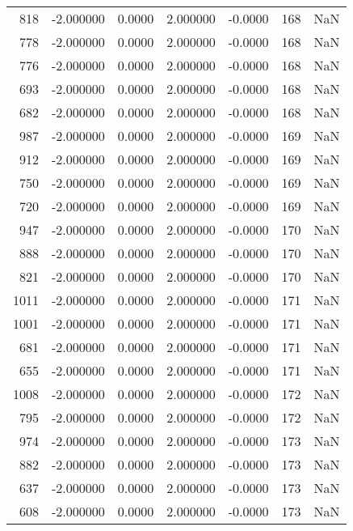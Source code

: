 \begin{tabular}{rrrrrrr}
 818 &   -2.000000 &    0.0000 &    2.000000 &     -0.0000 &         168 & NaN \\
 778 &   -2.000000 &    0.0000 &    2.000000 &     -0.0000 &         168 & NaN \\
 776 &   -2.000000 &    0.0000 &    2.000000 &     -0.0000 &         168 & NaN \\
 693 &   -2.000000 &    0.0000 &    2.000000 &     -0.0000 &         168 & NaN \\
 682 &   -2.000000 &    0.0000 &    2.000000 &     -0.0000 &         168 & NaN \\
 987 &   -2.000000 &    0.0000 &    2.000000 &     -0.0000 &         169 & NaN \\
 912 &   -2.000000 &    0.0000 &    2.000000 &     -0.0000 &         169 & NaN \\
 750 &   -2.000000 &    0.0000 &    2.000000 &     -0.0000 &         169 & NaN \\
 720 &   -2.000000 &    0.0000 &    2.000000 &     -0.0000 &         169 & NaN \\
 947 &   -2.000000 &    0.0000 &    2.000000 &     -0.0000 &         170 & NaN \\
 888 &   -2.000000 &    0.0000 &    2.000000 &     -0.0000 &         170 & NaN \\
 821 &   -2.000000 &    0.0000 &    2.000000 &     -0.0000 &         170 & NaN \\
1011 &   -2.000000 &    0.0000 &    2.000000 &     -0.0000 &         171 & NaN \\
1001 &   -2.000000 &    0.0000 &    2.000000 &     -0.0000 &         171 & NaN \\
 681 &   -2.000000 &    0.0000 &    2.000000 &     -0.0000 &         171 & NaN \\
 655 &   -2.000000 &    0.0000 &    2.000000 &     -0.0000 &         171 & NaN \\
1008 &   -2.000000 &    0.0000 &    2.000000 &     -0.0000 &         172 & NaN \\
 795 &   -2.000000 &    0.0000 &    2.000000 &     -0.0000 &         172 & NaN \\
 974 &   -2.000000 &    0.0000 &    2.000000 &     -0.0000 &         173 & NaN \\
 882 &   -2.000000 &    0.0000 &    2.000000 &     -0.0000 &         173 & NaN \\
 637 &   -2.000000 &    0.0000 &    2.000000 &     -0.0000 &         173 & NaN \\
 608 &   -2.000000 &    0.0000 &    2.000000 &     -0.0000 &         173 & NaN \\

\end{tabular}

